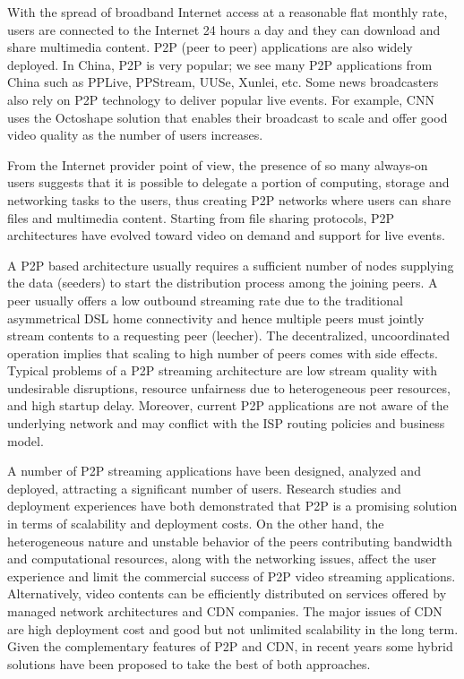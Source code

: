 \documentclass[paper]{ieice}
\begin{document}
With the spread of broadband Internet access at a reasonable flat
monthly rate, users are connected to the Internet 24 hours a day and
they can download and share multimedia content.  P2P (peer to peer)
applications are also widely deployed.  In China, P2P is very popular;
we see many P2P applications from China such as PPLive, PPStream,
UUSe, Xunlei, etc.  Some news broadcasters also rely on P2P technology
to deliver popular live events.  For example, CNN uses the Octoshape
solution that enables their broadcast to scale and offer good video
quality as the number of users increases.

From the Internet provider point of view, the presence of so many
always-on users suggests that it is possible to delegate a portion of
computing, storage and networking tasks to the users, thus creating
P2P networks where users can share files and multimedia content.
Starting from file sharing protocols, P2P architectures have evolved
toward video on demand and support for live events.

A P2P based architecture usually requires a sufficient number of nodes
supplying the data (seeders) to start the distribution process among
the joining peers.  A peer usually offers a low outbound streaming
rate due to the traditional asymmetrical DSL home connectivity and
hence multiple peers must jointly stream contents to a requesting peer
(leecher).  The decentralized, uncoordinated operation implies that
scaling to high number of peers comes with side effects.  Typical
problems of a P2P streaming architecture are low stream quality with
undesirable disruptions, resource unfairness due to heterogeneous peer
resources, and high startup delay.  Moreover, current P2P applications
are not aware of the underlying network and may conflict with the ISP
routing policies and business model.

A number of P2P streaming applications have been designed, analyzed
and deployed, attracting a significant number of users.  Research
studies and deployment experiences have both demonstrated that P2P is
a promising solution in terms of scalability and deployment costs.  On
the other hand, the heterogeneous nature and unstable behavior of the
peers contributing bandwidth and computational resources, along with
the networking issues, affect the user experience and limit the
commercial success of P2P video streaming applications.
Alternatively, video contents can be efficiently distributed on
services offered by managed network architectures and CDN companies.
The major issues of CDN are high deployment cost and good but not
unlimited scalability in the long term.  Given the complementary
features of P2P and CDN, in recent years some hybrid solutions have
been proposed
\cite{Huang:2008:UHC:1496046.1496064,4772628,Yin:2009:DDH:1631272.1631279}
to take the best of both approaches.
\end{document}
